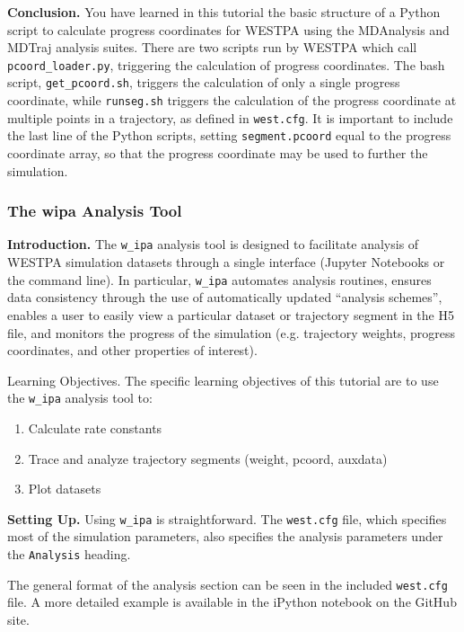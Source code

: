 \documentclass[9pt,tutorial]{livecoms}
\begin{document}
\textbf{Conclusion.} You have learned in this tutorial the basic structure of a Python script to calculate progress coordinates for WESTPA using the MDAnalysis and MDTraj analysis suites. 
There are two scripts run by WESTPA which call \verb|pcoord_loader.py|, triggering the calculation of progress coordinates. 
The bash script, \verb|get_pcoord.sh|, triggers the calculation of only a single progress coordinate, while \verb|runseg.sh| triggers the calculation of the progress coordinate at multiple points in a trajectory, as defined in \verb|west.cfg|. 
It is important to include the last line of the Python scripts, setting \verb|segment.pcoord| equal to the progress coordinate array, so that the progress coordinate may be used to further the simulation.

\subsubsection{The w\textunderscore ipa Analysis Tool}

\textbf{Introduction.} The \verb|w_ipa| analysis tool is designed to facilitate analysis of WESTPA simulation datasets through a single interface (Jupyter Notebooks or the command line). 
In particular, \verb|w_ipa| automates analysis routines, ensures data consistency through the use of automatically updated “analysis schemes”, enables a user to easily view a particular dataset or trajectory segment in the H5 file, and monitors the progress of the simulation (e.g. trajectory weights, progress coordinates, and other properties of interest).  

Learning Objectives. The specific learning objectives of this tutorial are to use the \verb|w_ipa| analysis tool to:
\begin{enumerate} 
\item Calculate rate constants
\item Trace and analyze trajectory segments (weight, pcoord, auxdata)
\item Plot datasets
\end{enumerate}

\textbf{Setting Up.}  Using \verb|w_ipa| is straightforward. 
The \verb|west.cfg| file, which specifies most of the simulation parameters, also specifies the analysis parameters under the \verb|Analysis| heading.

The general format of the analysis section can be seen in the included \verb|west.cfg| file. 
A more detailed example is available in the iPython notebook on the GitHub site.
\end{document}
